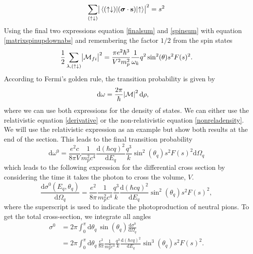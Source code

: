 \begin{equation} \label{spinsum}
	\sum_{(\uparrow\downarrow)} \abs{\mel*{(\uparrow\downarrow)}{(\bm{\mathrm{\sigma}}\cdot\bm{\mathrm{s}})}{\uparrow}}^2 = s^2
\end{equation}
Using the final two expressions equation \eqref{finalsum} and \eqref{spinsum} with equation \eqref{matrixspinupdownabs} and remembering the factor $1/2$ from the spin states
\begin{equation} \label{absmatrixexact}
	\frac{1}{2}\sum_{\lambda,(\uparrow\downarrow)} \abs{\mathcal{M}_{fi}}^2 = \frac{\pi e^2\hbar^3}{V^2 m_p^2}\frac{1}{\omega_k} q^2\sin^2(\theta) s^2 F(s)^2.
\end{equation}
According to Fermi's golden rule, the transition probability is given by
\begin{align}\label{Fermisgolden}
	\text{d}\omega &= \frac{2\pi}{\hbar}\abs{\mathcal{M}}^2\text{d}\rho,
\end{align}
where we can use both expressions for the density of states. We can either use the relativistic equation \eqref{derivative} or the non-relativistic equation \eqref{nonreladensity}. We will use the relativistic expression as an example but show both results at the end of the section. This leads to the final transition probability
\begin{equation}
	\text{d}\omega^0 = \frac{e^2c}{8\pi V}\frac{1}{m_p^2 c^4}\frac{\text{d}(\hbar c q)^2}{\text{d}E_q}\frac{q^3}{k} \sin^2(\theta_q) s^2 F(s)^2 \text{d}\Omega_q
\end{equation}
which leads to the following expression for the differential cross section by considering the time it takes the photon to cross the volume, $V$.
\begin{equation}\label{exactdiffcross}
	\frac{\text{d}\sigma^0(E_q,\theta_q)}{\text{d}\Omega_q} = \frac{e^2}{8\pi}\frac{1}{m_p^2c^4}\frac{q^3}{k}\frac{\text{d}(\hbar c q)^2}{\text{d}E_q}\sin^2(\theta_q) s^2 F(s)^2,
\end{equation}
where the superscript is used to indicate the photoproduction of neutral pions. To get the total cross-section, we integrate all angles
\begin{align} \label{exactcross}
	\sigma^0 & = 2\pi \int_0^\pi \text{d}\theta_q \, \sin(\theta_q) \frac{\text{d}\sigma^0}{\text{d}\Omega_q} \\ &= 2\pi \int_0^\pi \text{d}\theta_q \, \frac{e^2}{8\pi}\frac{1}{m_p^2c^4}\frac{q^3}{k}\frac{\text{d}(\hbar c q)^2}{\text{d}E_q}\sin^3(\theta_q) s^2 F(s)^2 \label{finalcrosser}.
\end{align}
